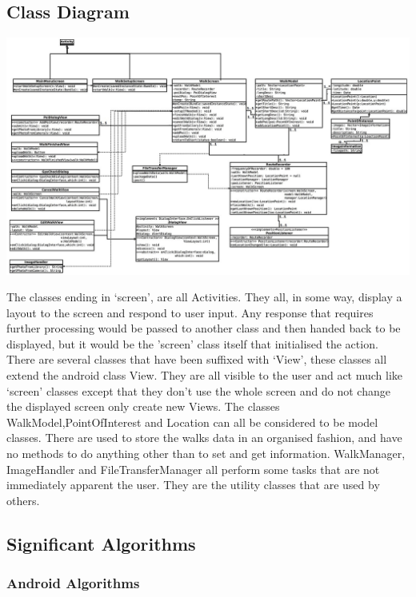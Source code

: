 \documentclass[12pt]{article}
\begin{document}
\subsection{Class Diagram}
\begin{landscape}
\begin{adjustwidth}{-1cm}{-0cm}
\includegraphics[scale=0.6]{Design/class_diagram_new.jpg}
\end{adjustwidth}
\end{landscape}
\restoregeometry
The classes ending in ‘screen’, are all Activities. They all, in some way, display a layout to the screen and respond to user input. Any response that requires further processing would be passed to another class and then handed back to be displayed, but it would be the ’screen’ class itself that initialised the action.  
There are several classes that have been suffixed with ‘View’, these classes all extend the android class View. They are all visible to the user and act much like ‘screen’ classes except that they don’t use the whole screen and do not change the displayed screen only create new Views.  
The classes WalkModel,PointOfInterest and Location can all be considered to be model classes. There are used to store the walks data in an organised fashion, and have no methods to do anything other than to set and get information.  
WalkManager, ImageHandler and FileTransferManager all perform some tasks that are not immediately apparent the user. They are the utility classes that are used by others.
\subsection{Significant Algorithms}
\subsubsection{Android Algorithms}
\end{document}
